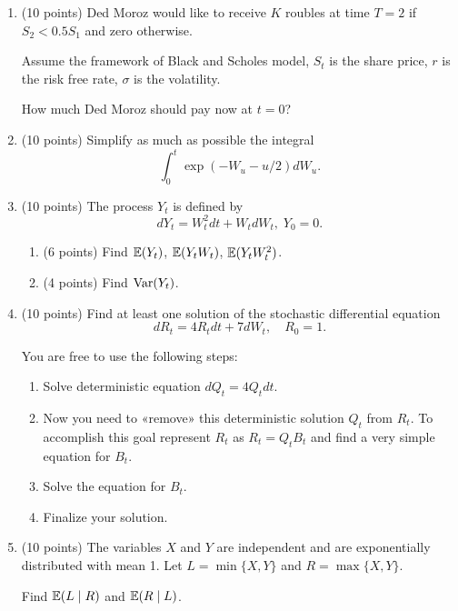 \documentclass[12pt, a4paper]{article}
\begin{document}
\begin{enumerate}

    \item (10 points) Ded Moroz would like to receive $K$ roubles at time $T=2$ if $S_2< 0.5S_1$ and zero otherwise.
    
    Assume the framework of Black and Scholes model, $S_t$ is the share price, $r$ is the risk free rate,
    $\sigma$ is the volatility. 

    How much Ded Moroz should pay now at $t=0$?
    
    \item (10 points) Simplify as much as possible the integral
    \[
    \int_0^t \exp(-W_u - u/2) dW_u.    
    \]

    \item (10 points) The process $Y_t$ is defined by 
    \[
    dY_t = W_t^2 dt  + W_t dW_t, \; Y_0 = 0.    
    \]
    \begin{enumerate}
        \item (6 points) Find $\operatorname{\mathbb{E}}(Y_t)$, $\operatorname{\mathbb{E}}(Y_t W_t)$, $\operatorname{\mathbb{E}}(Y_t W_t^2)$.
        \item (4 points) Find $\operatorname{Var}(Y_t)$.
    \end{enumerate}

    \item (10 points) Find at least one solution of the stochastic differential equation
    \[
    dR_t = 4R_t dt + 7 dW_t, \quad R_0 = 1.
    \]

    You are free to use the following steps:
    \begin{enumerate}
        \item Solve deterministic equation $dQ_t = 4Q_t dt$.
        \item Now you need to «remove» this deterministic solution $Q_t$ from $R_t$. 
        To accomplish this goal represent $R_t$ as $R_t = Q_t B_t$ and find a very simple equation for $B_t$.
        \item Solve the equation for $B_t$.
        \item Finalize your solution.
    \end{enumerate}

    \item (10 points) The variables $X$ and $Y$ are independent and are exponentially distributed with mean 1.
    Let $L = \min \{X, Y\}$ and $R = \max \{X, Y\}$. 

    Find $\operatorname{\mathbb{E}}(L \mid R)$ and $\operatorname{\mathbb{E}}(R\mid L)$.

    \vspace{20pt}


\end{enumerate}
\end{document}

